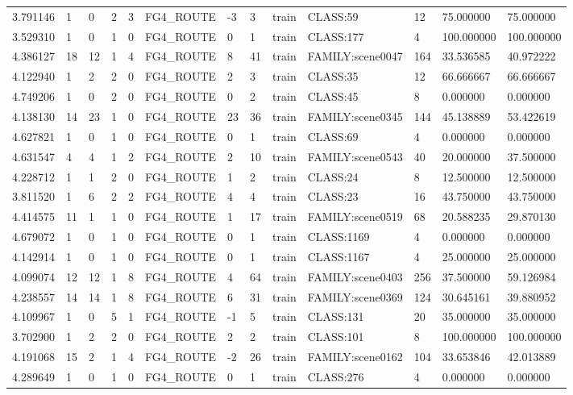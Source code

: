 \begin{tabular}{lllllllllllll}
3.791146 & 1 & 0 & 2 & 3 & FG4\_ROUTE & -3 & 3 & train & CLASS:59 & 12 & 75.000000 & 75.000000 \\
3.529310 & 1 & 0 & 1 & 0 & FG4\_ROUTE & 0 & 1 & train & CLASS:177 & 4 & 100.000000 & 100.000000 \\
4.386127 & 18 & 12 & 1 & 4 & FG4\_ROUTE & 8 & 41 & train & FAMILY:scene0047 & 164 & 33.536585 & 40.972222 \\
4.122940 & 1 & 2 & 2 & 0 & FG4\_ROUTE & 2 & 3 & train & CLASS:35 & 12 & 66.666667 & 66.666667 \\
4.749206 & 1 & 0 & 2 & 0 & FG4\_ROUTE & 0 & 2 & train & CLASS:45 & 8 & 0.000000 & 0.000000 \\
4.138130 & 14 & 23 & 1 & 0 & FG4\_ROUTE & 23 & 36 & train & FAMILY:scene0345 & 144 & 45.138889 & 53.422619 \\
4.627821 & 1 & 0 & 1 & 0 & FG4\_ROUTE & 0 & 1 & train & CLASS:69 & 4 & 0.000000 & 0.000000 \\
4.631547 & 4 & 4 & 1 & 2 & FG4\_ROUTE & 2 & 10 & train & FAMILY:scene0543 & 40 & 20.000000 & 37.500000 \\
4.228712 & 1 & 1 & 2 & 0 & FG4\_ROUTE & 1 & 2 & train & CLASS:24 & 8 & 12.500000 & 12.500000 \\
3.811520 & 1 & 6 & 2 & 2 & FG4\_ROUTE & 4 & 4 & train & CLASS:23 & 16 & 43.750000 & 43.750000 \\
4.414575 & 11 & 1 & 1 & 0 & FG4\_ROUTE & 1 & 17 & train & FAMILY:scene0519 & 68 & 20.588235 & 29.870130 \\
4.679072 & 1 & 0 & 1 & 0 & FG4\_ROUTE & 0 & 1 & train & CLASS:1169 & 4 & 0.000000 & 0.000000 \\
4.142914 & 1 & 0 & 1 & 0 & FG4\_ROUTE & 0 & 1 & train & CLASS:1167 & 4 & 25.000000 & 25.000000 \\
4.099074 & 12 & 12 & 1 & 8 & FG4\_ROUTE & 4 & 64 & train & FAMILY:scene0403 & 256 & 37.500000 & 59.126984 \\
4.238557 & 14 & 14 & 1 & 8 & FG4\_ROUTE & 6 & 31 & train & FAMILY:scene0369 & 124 & 30.645161 & 39.880952 \\
4.109967 & 1 & 0 & 5 & 1 & FG4\_ROUTE & -1 & 5 & train & CLASS:131 & 20 & 35.000000 & 35.000000 \\
3.702900 & 1 & 2 & 2 & 0 & FG4\_ROUTE & 2 & 2 & train & CLASS:101 & 8 & 100.000000 & 100.000000 \\
4.191068 & 15 & 2 & 1 & 4 & FG4\_ROUTE & -2 & 26 & train & FAMILY:scene0162 & 104 & 33.653846 & 42.013889 \\
4.289649 & 1 & 0 & 1 & 0 & FG4\_ROUTE & 0 & 1 & train & CLASS:276 & 4 & 0.000000 & 0.000000 \\

\end{tabular}
